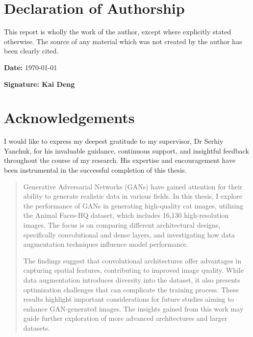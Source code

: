 \documentclass[12pt,a4paper]{report}
\begin{document}
\onehalfspacing

\chapter*{Declaration of Authorship}

This report is wholly the work of the author, except where explicitly
stated otherwise. The source of any material which was not created
by the author has been clearly cited. \\
\medskip{}

\textbf{Date:} \quad \today

\medskip{}

\textbf{Signature: Kai Deng} 

\chapter*{Acknowledgements}

I would like to express my deepest gratitude to my supervisor, Dr Serhiy Yanchuk, 
for his invaluable guidance, continuous support, and insightful feedback throughout the 
course of my research. His expertise and encouragement have been instrumental in the 
successful completion of this thesis.

\begin{abstract}
Generative Adversarial Networks (GANs) have gained attention for their ability to generate realistic data in various fields. In this thesis, I explore the performance of GANs in generating high-quality cat images, utilizing the Animal Faces-HQ dataset, which includes 16,130 high-resolution images. The focus is on comparing different architectural designs, specifically convolutional and dense layers, and investigating how data augmentation techniques influence model performance.

The findings suggest that convolutional architectures offer advantages in capturing spatial features, contributing to improved image quality. While data augmentation introduces diversity into the dataset, it also presents optimization challenges that can complicate the training process. These results highlight important considerations for future studies aiming to enhance GAN-generated images. The insights gained from this work may guide further exploration of more advanced architectures and larger datasets.
\end{abstract}

\tableofcontents{}

\listoffigures{}

\listoftables{}

\lstlistoflistings

\newpage


\newpage


\newpage


\newpage


\newpage


\newpage
\appendix




\end{document}
